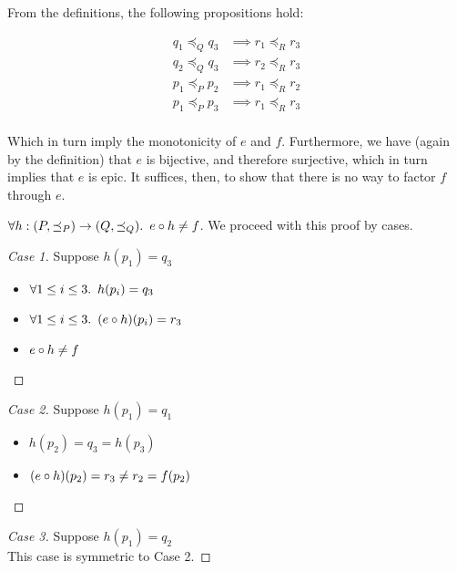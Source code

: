 From the definitions, the following propositions hold:

\begin{align*}
  q_1 \preceq_Q q_3 & \implies r_1 \preceq_R r_3 \\
  q_2 \preceq_Q q_3 & \implies r_2 \preceq_R r_3 \\
  p_1 \preceq_P p_2 & \implies r_1 \preceq_R r_2 \\
  p_1 \preceq_P p_3 & \implies r_1 \preceq_R r_3 \\
\end{align*}

Which in turn imply the monotonicity of $e$ and $f$. Furthermore, we have (again by the definition) that $e$ is bijective, and therefore surjective, which in turn implies that $e$ is epic. It suffices, then, to show that there is no way to factor $f$ through $e$.

\begin{prop}
  $\forall h : (P,\preceq_P)\to(Q,\preceq_Q)\ldotp~e\circ h \neq f$. We proceed with this proof by cases.

  \begin{proof}[Case 1]
    Suppose $h(p_1) = q_3$
    \begin{itemize}
      \item[\imps] $\forall 1\leq i\leq 3\ldotp~h(p_i) = q_3$
      \item[\imps] $\forall 1\leq i\leq 3\ldotp~(e\circ h)(p_i) = r_3$
      \item[\imps] $e\circ h\neq f$
        \qedhere
    \end{itemize}
  \end{proof}

  \begin{proof}[Case 2]
    Suppose $h(p_1) = q_1$
    \begin{itemize}
      \item[\imps] $h(p_2) = q_3 = h(p_3)$
      \item[\imps] $(e\circ h)(p_2) = r_3 \neq r_2 = f(p_2)$
        \qedhere
    \end{itemize}
  \end{proof}

  \begin{proof}[Case 3]
    Suppose $h(p_1) = q_2$\\
    This case is symmetric to Case 2.\qedhere
  \end{proof}
\end{prop}


